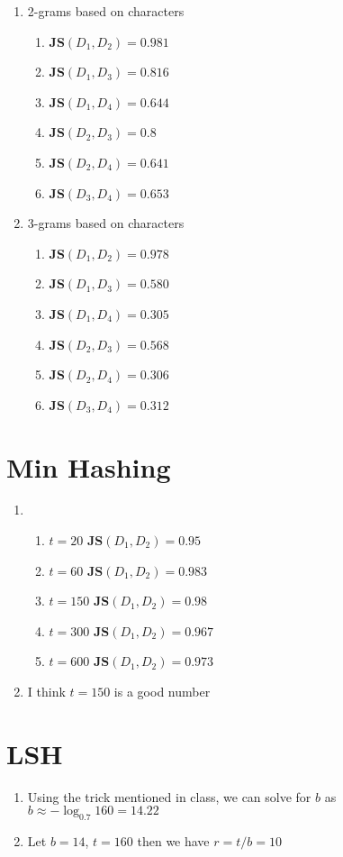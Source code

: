 \documentclass[11pt]{article}
\begin{document}
\begin{enumerate}[label=\textbf{\Alph*:}]
\begin{enumerate}[label=B.\arabic*]
\item
2-grams based on characters
\begin{enumerate}[label=\arabic*)]
\item
\textbf{JS}$(D_{1}, D_{2}) = 0.981$
\item
\textbf{JS}$(D_{1}, D_{3}) = 0.816$
\item
\textbf{JS}$(D_{1}, D_{4}) = 0.644$
\item
\textbf{JS}$(D_{2}, D_{3}) = 0.8$
\item
\textbf{JS}$(D_{2}, D_{4}) = 0.641$
\item
\textbf{JS}$(D_{3}, D_{4}) = 0.653$
\end{enumerate}
\item
3-grams based on characters
\begin{enumerate}[label=\arabic*)]
\item
\textbf{JS}$(D_{1}, D_{2}) = 0.978$
\item
\textbf{JS}$(D_{1}, D_{3}) = 0.580$
\item
\textbf{JS}$(D_{1}, D_{4}) = 0.305$
\item
\textbf{JS}$(D_{2}, D_{3}) = 0.568$
\item
\textbf{JS}$(D_{2}, D_{4}) = 0.306$
\item
\textbf{JS}$(D_{3}, D_{4}) = 0.312$
\end{enumerate}

\end{enumerate}

\end{enumerate}

\section{Min Hashing}
\begin{enumerate}[label=\textbf{\Alph*:}]
\item
\begin{enumerate}[label=\arabic*)]
\item
$t = 20$ \textbf{JS}$(D_{1}, D_{2}) = 0.95$
\item
$t = 60$ \textbf{JS}$(D_{1}, D_{2}) = 0.983$
\item
$t = 150$ \textbf{JS}$(D_{1}, D_{2}) = 0.98$
\item
$t = 300$ \textbf{JS}$(D_{1}, D_{2}) = 0.967$
\item
$t = 600$ \textbf{JS}$(D_{1}, D_{2}) = 0.973$
\end{enumerate}
\item
I think $t = 150$ is a good number
\end{enumerate}
\section{LSH}\begin{enumerate}[label=\textbf{\Alph*:}]
\item
Using the trick mentioned in class, we can solve for $b$ as\\
$b \approx -\log_{0.7} 160 = 14.22$

\item
Let $b = 14$, $t = 160$ then we have $r = t/b = 10$


\end{enumerate}
\end{document}
